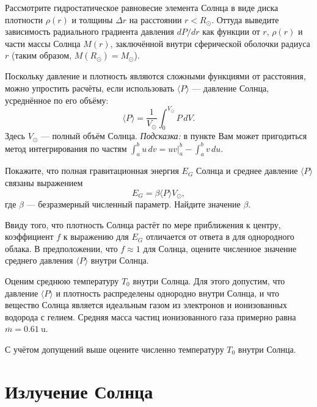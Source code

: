 \begin{task}
    \item Рассмотрите гидростатическое равновесие элемента Солнца в виде диска плотности $\rho(r)$ и толщины $\Delta r$ на расстоянии $r<R_\odot$. Оттуда выведите зависимость радиального градиента давления $dP/dr$ как функции от $r$, $\rho(r)$ и части массы Солнца $M(r)$, заключённой внутри сферической оболочки радиуса $r$ (таким образом, $M(R_\odot)=M_\odot$).
\end{task}

Поскольку давление и плотность являются сложными функциями от расстояния, можно упростить расчёты, если использовать $\langle P\rangle$ --- давление Солнца, усреднённое по его объёму:
$$
\langle P\rangle = \frac1{V_\odot} \int_0^{V_{\odot}} P\, dV.
$$
Здесь $V_\odot$ --- полный объём Солнца. \textit{Подсказка:} в пункте  Вам может пригодиться метод интегрирования по частям $\int_a^b u\,dv= uv|_a^b-\int_a^b v\,du$.

\begin{task}
    \item Покажите, что полная гравитационная энергия $E_G$ Солнца и среднее давление $\langle P\rangle$ связаны выражением
    $$
    E_G = \beta\langle P\rangle V_\odot,
    $$
    где $\beta$ --- безразмерный численный параметр. Найдите значение $\beta$.
    \item Ввиду того, что плотность Солнца растёт по мере приближения к центру, коэффициент $f$ к выражению для $E_G$ отличается от ответа в  для однородного облака. В предположении, что $f\approx1$ для Солнца, оцените численное значение среднего давления $\langle P\rangle$ внутри Солнца.
\end{task}

Оценим среднюю температуру $T_0$ внутри Солнца. Для этого допустим, что давление $\langle P\rangle$ и плотность распределены однородно внутри Солнца, и что вещество Солнца является идеальным газом из электронов и ионизованных водорода с гелием. Средняя масса частиц ионизованного газа примерно равна $\overline m=\qty{0.61}{\amu}$.

\begin{task}
    \item С учётом допущений выше оцените численно температуру $T_0$ внутри Солнца.
\end{task}

\part{Излучение Солнца}

